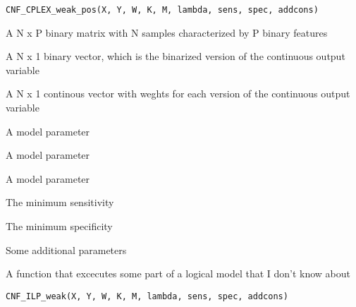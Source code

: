 \documentclass[letterpaper]{book}
\begin{document}
%
\begin{Usage}
\begin{verbatim}
CNF_CPLEX_weak_pos(X, Y, W, K, M, lambda, sens, spec, addcons)
\end{verbatim}
\end{Usage}
%
\begin{Arguments}
\begin{ldescription}
\item[\code{X}] A N x P binary matrix with N samples characterized by P binary features

\item[\code{Y}] A N x 1 binary vector, which is the binarized version of the continuous output variable

\item[\code{W}] A N x 1 continous vector with weghts for each version of the continuous output variable

\item[\code{K}] A model parameter

\item[\code{M}] A model parameter

\item[\code{lambda}] A model parameter

\item[\code{sens}] The minimum sensitivity

\item[\code{spec}] The minimum specificity

\item[\code{addcons}] Some additional parameters
\end{ldescription}
\end{Arguments}
%
\begin{Description}\relax
A function that excecutes some part of a logical model that I don't know about
\end{Description}
%
\begin{Usage}
\begin{verbatim}
CNF_ILP_weak(X, Y, W, K, M, lambda, sens, spec, addcons)
\end{verbatim}
\end{Usage}
%
\end{document}
